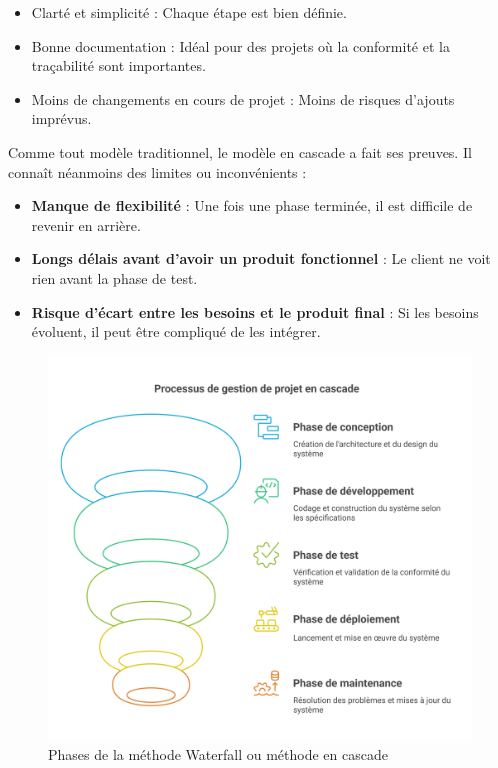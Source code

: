 {\vspace{0.3cm}

\begin{itemize}
    \item Clarté et simplicité : Chaque étape est bien définie.
    \item Bonne documentation : Idéal pour des projets où la conformité et la traçabilité sont importantes.
    \item Moins de changements en cours de projet : Moins de risques d’ajouts imprévus.
\end{itemize}

Comme tout modèle traditionnel, le modèle en cascade a fait ses preuves.  Il connaît néanmoins des limites ou inconvénients :

\begin{itemize}
    \item \textbf{Manque de flexibilité} : Une fois une phase terminée, il est difficile de revenir en arrière.
    \item \textbf{Longs délais avant d’avoir un produit fonctionnel} : Le client ne voit rien avant la phase de test.
    \item \textbf{Risque d’écart entre les besoins et le produit final} : Si les besoins évoluent, il peut être compliqué de les intégrer.
\end{itemize}

\vspace{0.3cm}

\begin{figure}[H]
\begin{center}
\includegraphics[width=15cm]{assets/presentation/waterfall.png}
\end{center}
\caption{Phases de la méthode Waterfall ou méthode en cascade}
\end{figure}

}
